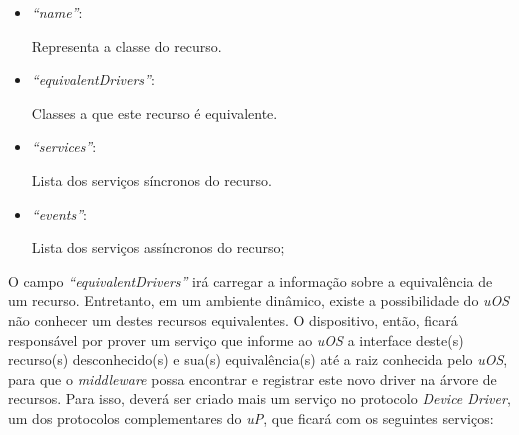 \begin{itemize}
	\item \emph{``name''}:
		
		Representa a classe do recurso.

	\item \emph{``equivalentDrivers''}:
	
		Classes a que este recurso é equivalente.
	\item \emph{``services''}:

		Lista dos serviços síncronos do recurso.

	\item \emph{``events''}:

		Lista dos serviços assíncronos do recurso;
\end{itemize}

O campo \emph{``equivalentDrivers''} irá carregar a informação sobre a equivalência de um recurso. Entretanto, em um ambiente dinâmico, existe a possibilidade do \emph{uOS} não conhecer um destes recursos equivalentes. O dispositivo, então, ficará responsável por prover um serviço que informe ao \emph{uOS} a interface deste(s) recurso(s) desconhecido(s) e sua(s) equivalência(s) até a raiz conhecida pelo \emph{uOS}, para que o \emph{middleware} possa encontrar e registrar este novo driver na árvore de recursos. Para isso, deverá ser criado mais um serviço no protocolo \emph{Device Driver}, um dos protocolos complementares do \emph{uP}, que ficará com os seguintes serviços:

